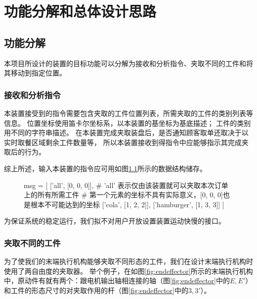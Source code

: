 
\chapter{功能分解和总体设计思路}

\section{功能分解}

本项目所设计的装置的目标功能可以分解为接收和分析指令、夹取不同的工件和将其移动到指定位置。

\subsection{接收和分析指令}

本装置接受到的指令需要包含夹取的工件位置列表，所需夹取的工件的类别列表等信息。
位置坐标使用笛卡尔坐标系，以本装置的基坐标为基底描述；
工件的类别用不同的字符串描述。
在本装置完成夹取装盘后，是否通知顾客取单还取决于以实时取餐区域剩余工件数量等，
所以本装置接收到得指令中应能够指示其完成夹取后的行为。

综上所述，输入本装置的指令应可用如图\ref{fig:codeblock}所示的数据结构储存。

\begin{figure}[!h]
\begin{codeblock}[language=python]
    msg = [
        ['all', [0, 0, 0]],  
        # 'all' 表示仅由该装置就可以夹取本次订单上的所有所需工件
        # 第一个元素的坐标不具有实际意义，[0, 0, 0]也是根本不可能达到的坐标
        ['cola', [1, 2, 2]],
        ['hamburger', [1, 3, 3]]
        ]
\end{codeblock}
\label{fig:codeblock}
\end{figure}

为保证系统的稳定运行，我们拟不对用户开放设置装置运动快慢的接口。

\subsection{夹取不同的工件}

为了使我们的末端执行机构能够夹取不同形态的工件，我们在设计末端执行机构时使用了两自由度的夹取器。
举个例子，在如图\ref{fig:endeffector}所示的末端执行机构中，原动件有就有两个：跟电机输出轴相连接的轴（图\ref{fig:endeffector}中的$E, E'$）和工件的形态尺寸的对夹取作用的杆（图\ref{fig:endeffector}中的$3, 3'$）。

